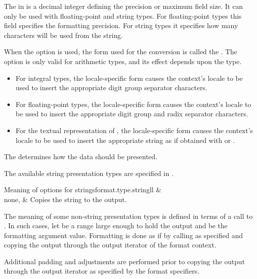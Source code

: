 \pnum
The  in
 is a decimal integer defining
the precision or maximum field size.
It can only be used with floating-point and string types.
For floating-point types this field specifies the formatting precision.
For string types it specifies how many characters will be used from the string.

\pnum
When the  option is used, the form used for the conversion is called
the .
The  option is only valid for arithmetic types, and
its effect depends upon the type.
\begin{itemize}
\item
For integral types, the locale-specific form
causes the context's locale to be used
to insert the appropriate digit group separator characters.

\item
For floating-point types, the locale-specific form
causes the context's locale to be used
to insert the appropriate digit group and radix separator characters.

\item
For the textual representation of , the locale-specific form
causes the context's locale to be used
to insert the appropriate string as if obtained
with  or .
\end{itemize}

\pnum
The  determines how the data should be presented.

\pnum
The available string presentation types are specified in .
%
\begin{floattable}{Meaning of  options for strings}{format.type.string}{ll}
\topline
{} &  \\ \rowsep
none,  &
Copies the string to the output.
\\
\end{floattable}

\pnum
The meaning of some non-string presentation types
is defined in terms of a call to .
In such cases,
let  be a range
large enough to hold the  output
and  be the formatting argument value.
Formatting is done as if by calling  as specified
and copying the output through the output iterator of the format context.
\begin{note}
Additional padding and adjustments are performed
prior to copying the output through the output iterator
as specified by the format specifiers.
\end{note}

